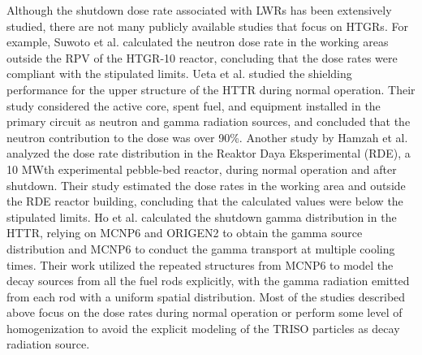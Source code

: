 Although the shutdown dose rate associated with LWRs has been extensively studied, there are not many publicly available studies that focus on \glspl*{HTGR}.
%
For example, Suwoto et al. \cite{suwoto_neutron_2018} calculated the neutron dose rate in the working areas outside the \gls*{RPV} of the HTGR-10 reactor, concluding that the dose rates were compliant with the stipulated limits.
% 
Ueta et al. \cite{ueta_shielding_2016} studied the shielding performance for the upper structure of the \gls*{HTTR} during normal operation.
Their study considered the active core, spent fuel, and equipment installed in the primary circuit as neutron and gamma radiation sources, and concluded that the neutron contribution to the dose was over 90\%.
% 
Another study by Hamzah et al. \cite{hamzah_preliminary_2019} analyzed the dose rate distribution in the Reaktor Daya Eksperimental (RDE), a 10 MWth experimental pebble-bed reactor, during normal operation and after shutdown.
Their study estimated the dose rates in the working area and outside the RDE reactor building, concluding that the calculated values were below the stipulated limits.
%
Ho et al. \cite{ho_calculation_2022} calculated the shutdown gamma distribution in the \gls*{HTTR}, relying on MCNP6 \cite{mcnp} and ORIGEN2 \cite{croff_origen2_1980} to obtain the gamma source distribution and MCNP6 to conduct the gamma transport at multiple cooling times.
Their work utilized the repeated structures from MCNP6 to model the decay sources from all the fuel rods explicitly, with the gamma radiation emitted from each rod with a uniform spatial distribution.
Most of the studies described above focus on the dose rates during normal operation or perform some level of homogenization to avoid the explicit modeling of the TRISO particles as decay radiation source.

